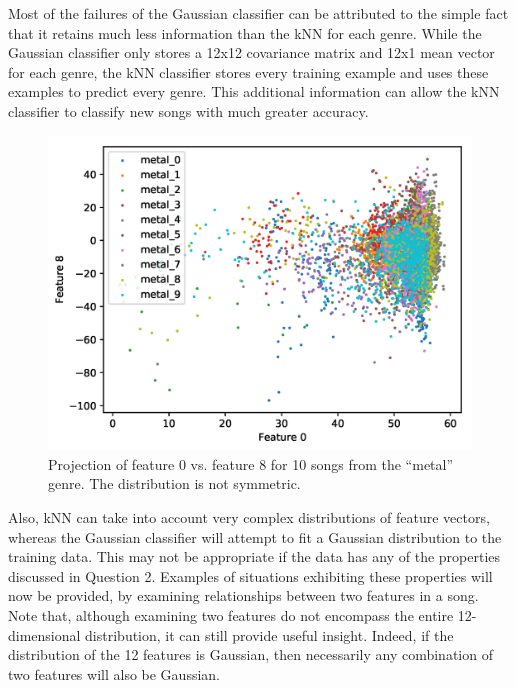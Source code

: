 \documentclass[a4paper,titlepage]{article}
\begin{document}
	Most of the failures of the Gaussian classifier can be attributed to the simple fact that it retains much less information than the kNN for each genre. While the Gaussian classifier only stores a 12x12 covariance matrix and 12x1 mean vector for each genre, the kNN classifier stores every training example and uses these examples to predict every genre. This additional information can allow the kNN classifier to classify new songs with much greater accuracy.
		
	
	\begin{figure}[!htb]
		\centering
		\includegraphics[width=\columnwidth]{plots/metal_non_symmetric.png}
		\caption
		{Projection of feature 0 vs. feature 8 for 10 songs from the ``metal'' genre. The distribution is not symmetric.}
		\label{fig:metal_non_symmetric}
	\end{figure}

	Also, kNN can take into account very complex distributions of feature vectors, whereas the Gaussian classifier will attempt to fit a Gaussian distribution to the training data. This may not be appropriate if the data has any of the properties discussed in Question 2. Examples of situations exhibiting these properties will now be provided, by examining relationships between two features in a song. Note that, although examining two features do not encompass the entire 12-dimensional distribution, it can still provide useful insight. Indeed, if the distribution of the 12 features is Gaussian, then necessarily any combination of two features will also be Gaussian.
	
\end{document}
